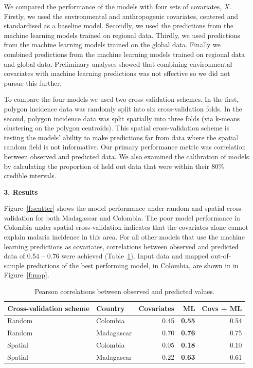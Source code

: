 \documentclass[11pt]{article}
\begin{document}
We compared the performance of the models with four sets of covariates, $X$.
Firstly, we used the environmental and anthropogenic covariates, centered and standardised as a baseline model.
Secondly, we used the predictions from the machine learning models trained on regional data.
Thirdly, we used predictions from the machine learning models trained on the global data.
Finally we combined predictions from the machine learning models trained on regional data and global data.
Preliminary analyses showed that combining environmental covariates with machine learning predictions was not effective so we did not pursue this further.


To compare the four models we used two cross-validation schemes. 
In the first, polygon incidence data was randomly split into six cross-validation folds.
In the second, polygon incidence data was split spatially into three folds (via k-means clustering on the polygon centroids).
This spatial cross-validation scheme is testing the models' ability to make predictions far from data where the spatial random field is not informative.
Our primary performance metric was correlation between observed and predicted data.
We also examined the calibration of models by calculating the proportion of held out data that were within their 80\% credible intervals.


{\bf 3. Results}

Figure~\ref{f:scatter} shows the model performance under random and spatial cross-validation for both Madagascar and Colombia. 
The poor model performance in Colombia under spatial cross-validation indicates that the covariates alone cannot explain malaria incidence in this area. 
For all other models that use the machine learning predictions as covariates, correlations between observed and predicted data of 0.54 -- 0.76 were achieved (Table~\ref{t:results}).
Input data and mapped out-of-sample predictions of the best performing model, in Colombia, are shown in in Figure~\ref{f:map}.


\begin{table}[h!]
\caption{Pearson correlations between observed and predicted values. }
\centering
\begin{tabular}{llrrr}
Cross-validation scheme & Country &  Covariates &  ML &  Covs + ML \\
\hline 
 Random &  Colombia &  0.45 &  \textbf{0.55} &  0.54 \\
 Random &  Madagascar &  0.70 &  \textbf{0.76} &  0.75 \\
 Spatial &  Colombia &  0.05 &  \textbf{0.18} &  0.10 \\
 Spatial &  Madagascar &  0.22 &  \textbf{0.63} &  0.61 
\end{tabular}
\label{t:results}
\end{table}
\end{document}

